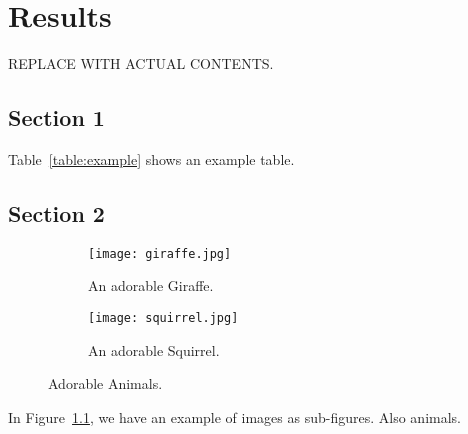 \chapter{Results}
REPLACE WITH ACTUAL CONTENTS.

\section{Section 1}

\begin{table}[h]
\centering

\label{table:example}
\end{table}

Table~\ref{table:example} shows an example table.

\section{Section 2}

\begin{figure}[h]
\centering
\begin{subfigure}[b]{.5\textwidth}
  \centering
  \texttt{[image: giraffe.jpg]}
  \caption{An adorable Giraffe.}
\end{subfigure}%
\begin{subfigure}[b]{.5\textwidth}
  \centering
  \texttt{[image: squirrel.jpg]}
  \caption{An adorable Squirrel.}
\end{subfigure}
\caption{Adorable Animals.\label{fig:example}}
\end{figure}

In Figure~\ref{fig:example}, we have an example of images as sub-figures. Also animals.